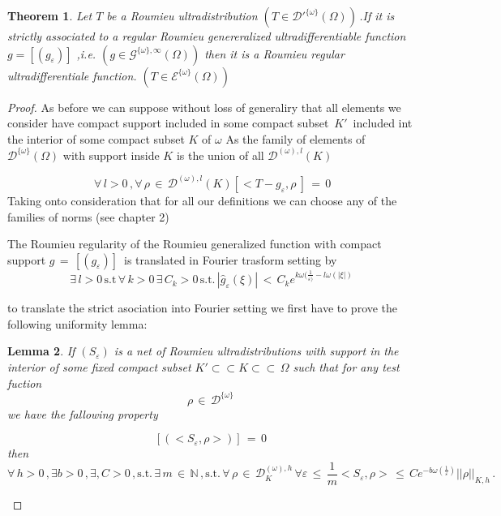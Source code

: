 \documentclass[12pt,a4paper]{amsart}
\newcommand{\NN}{\mathbb N}
\newtheorem{theorem}{Theorem}[section]
\newtheorem{lemma}[theorem]{Lemma}
\begin{document}
 \begin{theorem}
 Let $T$ be a Roumieu ultradistribution
  $(T\in\mathcal{D'}^{\{\omega\}}(\Omega))\,$.If it is 
 strictly associated to a regular Roumieu genereralized ultradifferentiable function $g=[(g_\varepsilon)]$ ,i.e.
 $(g\in\mathcal{G}^{\{\omega\},\infty}(\Omega))$
  then it is a Roumieu regular ultradifferentiale function.
  $( T\in \mathcal{E}^{\{\omega\}}(\Omega))\,$
  
\end{theorem}
   \begin{proof} 
 As before we can suppose without loss of generaliry that 
 all elements we consider have compact support included in some compact subset $\,K'\,$ included int the interior of some compact subset $K$ of $\omega$
 As the family of elements of $\mathcal{D}^{\{\omega\}} (\Omega)$ with support inside $K$ is the union of all
 $\mathcal{D}^{(\omega),l}(K)$
  
 
 $$ \,\forall\,l>0 \,,\forall\,\rho \,\in\,\mathcal{D}^{(\omega),l}(K)  
 [<T-g_\varepsilon,\rho\>] \,=\,0 $$
  Taking onto consideration that for all our definitions we can choose any of the families of norms (see chapter 2)                   
 
The Roumieu regularity of the Roumieu  generalized function with compact support
$ g\,=\,[(g_\varepsilon)]\,$ is translated in Fourier trasform setting  by 
$$\,\exists\,l>0\,\mbox{s.t}\,\forall\,k>0\,\exists
\,C_k >0\,\mbox{s.t.}\,
|\hat{g}_\varepsilon(\xi)|\,<\,
C_ke^{k\omega(\frac{1}{\varepsilon)}-l\omega(|\xi|)}\,$$
 
 to translate the strict asociation into Fourier setting we first have to prove the following uniformity lemma:
 
 \begin{lemma}
 If $(S_{\varepsilon})$ is a net of Roumieu ultradistributions with support in the interior of some fixed compact subset $K'\subset\subset K\subset\subset\,\Omega$ such that for any test fuction 
 $$\rho \,\in\,\mathcal{D}^{\{\omega\}} \,$$we have the fallowing property

 
 $$[(<S_\varepsilon,\rho>)] \,=\,0\,$$
then 
\begin{equation*}
\forall\,h>0\,,\exists b>0 \,,\exists, C>0 \,,\mbox{s.t.}\,
\exists\,m\,\in \,\NN \,,\mbox{s.t.}\,
\forall\,\rho\,\in\,\mathcal{D}^{(\omega),h}_K\,
\forall \varepsilon \,\leq \,\frac{1}{m}
<S_\varepsilon,\rho>\,\leq\,
Ce^{-b\omega(\frac{1}{\varepsilon})}||\rho||_{K,h} \,.
\end{equation*}
\end{lemma}


\end{proof}
\end{document}
